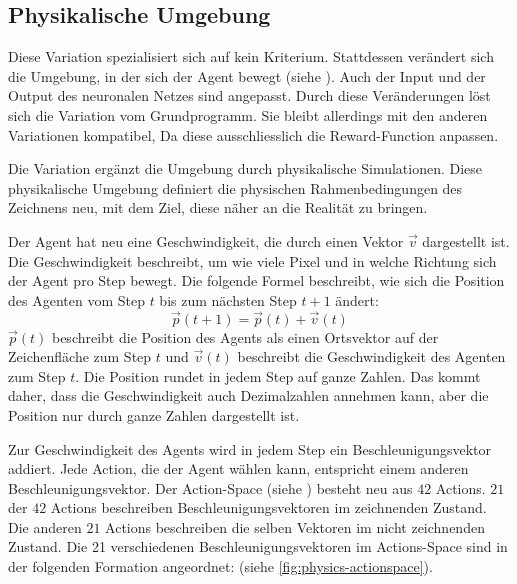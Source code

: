 \subsection{Physikalische Umgebung}\label{sub:m_var_phy}
Diese Variation spezialisiert sich auf kein Kriterium. Stattdessen verändert
sich die Umgebung, in der sich der Agent bewegt (siehe
). Auch der Input und der Output des neuronalen Netzes
sind angepasst. Durch diese Veränderungen löst sich die Variation vom
Grundprogramm. Sie bleibt allerdings mit den anderen Variationen kompatibel, Da
diese ausschliesslich die Reward-Function anpassen.

Die Variation ergänzt die Umgebung durch physikalische Simulationen. Diese
physikalische Umgebung definiert die physischen Rahmenbedingungen des Zeichnens
neu, mit dem Ziel, diese näher an die Realität zu bringen.

Der Agent hat neu eine Geschwindigkeit, die durch einen Vektor $\vec{v}$
dargestellt ist. Die Geschwindigkeit beschreibt, um wie viele Pixel und in
welche Richtung sich der Agent pro Step bewegt. Die folgende Formel beschreibt,
wie sich die Position des Agenten vom Step $t$ bis zum nächsten Step $t+1$
ändert:
\[ \vec{p}(t+1) = \vec{p}(t) + \vec{v}(t) \] 
$\vec{p}(t)$ beschreibt die Position des Agents als einen Ortsvektor auf der
Zeichenfläche zum Step $t$ und $\vec{v}(t)$ beschreibt die Geschwindigkeit des
Agenten zum Step $t$. Die Position rundet in jedem Step auf ganze Zahlen. Das
kommt daher, dass die Geschwindigkeit auch Dezimalzahlen annehmen kann, aber die
Position nur durch ganze Zahlen dargestellt ist.

Zur Geschwindigkeit des Agents wird in jedem Step ein Beschleunigungsvektor
addiert. Jede Action, die der Agent wählen kann, entspricht einem anderen
Beschleunigungsvektor. Der Action-Space (siehe )
besteht neu aus $42$ Actions. $21$ der $42$ Actions beschreiben
Beschleunigungsvektoren im zeichnenden Zustand. Die anderen $21$ Actions
beschreiben die selben Vektoren im nicht zeichnenden Zustand. Die 21
verschiedenen Beschleunigungsvektoren im Actions-Space sind in der folgenden
Formation angeordnet: (siehe \autoref{fig:physics-actionspace}). 

